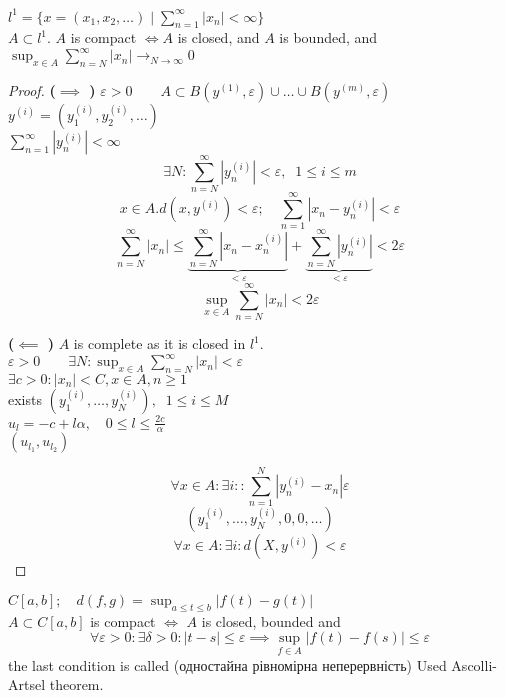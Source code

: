 \begin{example}
  $l^{1} = \{x = (x_1, x_2, \ldots) \mid  \sum_{n=1}^{\infty} \left| x_n \right| < \infty\} $ \\
  $A \subset l^{1}$. $A$ is compact $\iff A$ is closed, and $A$ is bounded, and $\sup_{x \in  A} \sum_{n=N}^{\infty} \left| x_n \right| \to_{N \to \infty} 0$ 

  \begin{proof}
    \textbf{($\implies$ )}
    $\varepsilon>0 \qquad A \subset B(y^{(1)}, \varepsilon) \cup \ldots \cup B(y^{(m)},\varepsilon)$ \\
    $y^{(i)} = \left( y^{(i)}_1, y^{(i)}_2, \ldots \right) $ \\
    $\sum_{n=1}^{\infty} \left| y^{(i)}_n \right| < \infty$ \\
    \[ \exists N: \sum_{n=N}^{\infty} \left| y^{(i)}_n \right| <\varepsilon, \;\; 1 \le  i \le  m \] 
    \[ x \in  A. d(x, y^{(i)}) < \varepsilon; \quad \sum_{n=1}^{\infty} \left| x_n - y_n^{(i)} \right| < \varepsilon \] 
    \[ \sum_{n=N}^{\infty} \left| x_n \right| \le  \underbrace{\sum_{n=N}^{\infty} \left| x_n - x^{(i)}_n \right|}_{<\varepsilon} + \underbrace{\sum_{n=N}^{\infty} \left| y^{(i)}_n \right|}_{< \varepsilon} < 2\varepsilon \] 
    \[ \sup_{x \in A}\sum_{n=N}^{\infty} \left| x_n \right| < 2\varepsilon \] 

    \textbf{($\impliedby$ )}
    $A$ is complete as it is closed in $l^{1}$.\\
    $\varepsilon>0 \qquad \exists N: \sup_{x\in A}\sum_{n=N}^{\infty} \left| x_n \right| < \varepsilon$ \\
    $\exists  c > 0: \left| x_n \right| < C, x \in  A, n \ge  1$ \\
    exists $(y^{(i)}_1, \ldots, y^{(i)}_{N}), \;\; 1 \le  i \le M$\\
    $u_l = -c + l\alpha, \quad 0 \le  l \le \frac{2c}{\alpha}$\\
    $(u_{l_1}, u_{l_2})$

    \[ \forall x \in  A: \exists i:: \sum_{n=1}^{N} \left| y^{(i)}_n - x_n \right| \varepsilon \] 
    \[ \left( y^{(i)}_1, \ldots, y^{(i)}_N, 0, 0, \ldots \right)  \] 
    \[ \forall x \in A: \exists i: d(X, y^{(i)}) < \varepsilon  \] 
  \end{proof}
\end{example}

\begin{example}
  $C[a,b]; \quad d(f,g) = \sup_{a \le  t \le  b} \left| f(t) - g(t) \right| $ \\
  $A \subset C[a,b]$ is compact $\iff$ $A$ is closed, bounded and  \[ 
  \forall \varepsilon>0: \exists \delta > 0: \left| t-s \right| \le \varepsilon \implies \sup_{f \in A}\left| f(t) - f(s) \right| \le \varepsilon \] 
  the last condition is called (одностайна рівномірна неперервність)
  Used Ascolli-Artsel theorem.
\end{example}



